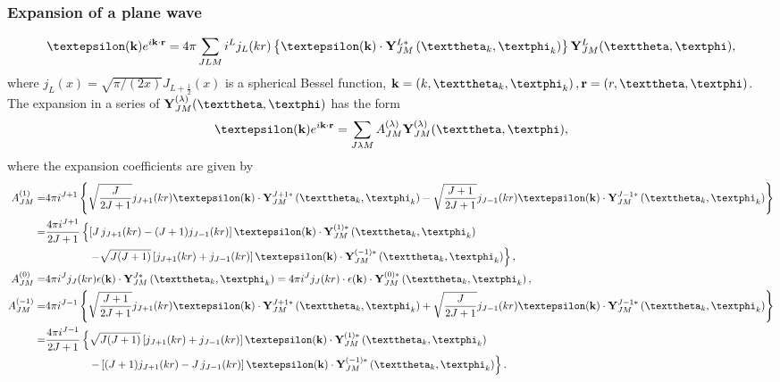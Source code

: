 \subsubsection{Expansion of a plane wave}
\begin{equation}
\boldsymbol{\varepsilon}(\vect{k}) e^{i \vect{k}\cdot\vect{r}}=4 \pi \sum_{J L M} i^{L} j_{L}(k r)\left\{\boldsymbol{\varepsilon}(\vect{k}) \cdot \vect{Y}_{J M}^{L *}\left(\vartheta_{k}, \varphi_{k}\right)\right\} \vect{Y}_{J M}^{L}(\vartheta, \varphi), \label{eq:7:3:131}
\end{equation}
where $j_{L}(x)=\sqrt{\pi /(2 x)} J_{L+\frac{1}{2}}(x)$ is a spherical Bessel function, $\vect{k}=\left(k, \vartheta_{k}, \varphi_{k}\right), \vect{r}=(r, \vartheta, \varphi)$. The expansion in a series of $\vect{Y}_{J M}^{(\lambda)}(\vartheta, \varphi)$ has the form
\begin{equation}
\boldsymbol{\varepsilon}(\vect{k}) e^{i \vect{k}\cdot\vect{r}}=\sum_{J \lambda M} A_{J M}^{(\lambda)} \vect{Y}_{J M}^{(\lambda)}(\vartheta, \varphi), \label{eq:7:3:132}
\end{equation}
where the expansion coefficients are given by
\begin{align}
A_{J M}^{(1)}=&4 \pi i^{J+1}  \left\{\sqrt{\frac{J}{2 J+1}} j_{J+1}(k r) \boldsymbol{\varepsilon}(\vect{k}) \cdot \vect{Y}_{J M}^{J+1 *}\left(\vartheta_{k}, \varphi_{k}\right)-\sqrt{\frac{J+1}{2 J+1}} j_{J-1}(k r) \boldsymbol{\varepsilon}(\vect{k}) \cdot \vect{Y}_{J M}^{J-1 *}\left(\vartheta_{k}, \varphi_{k}\right)\right\}  \notag\\
= & \frac{4 \pi i^{J+1}}{2 J+1}\left\{\left[J  \, j_{J+1}(k r)-(J+1) j_{J-1}(k r)\right] \boldsymbol{\varepsilon}(\vect{k}) \cdot \vect{Y}_{J M}^{(1) *}\left(\vartheta_{k}, \varphi_{k}\right)\right. \notag\\
& \qquad\qquad \left.-\sqrt{J(J+1)}\left[j_{J+1}(k r)+j_{J-1}(k r)\right] \boldsymbol{\varepsilon}(\vect{k}) \cdot \vect{Y}_{J M}^{(-1) *}\left(\vartheta_{k}, \varphi_{k}\right)\right\}, \label{eq:7:3:133}\\
A_{J M}^{(0)}=&4 \pi i^{J} j_{J}(k r) \vect{\epsilon}(\vect{k}) \cdot \vect{Y}_{J M}^{J *}\left(\vartheta_{k}, \varphi_{k}\right)=4 \pi i^{J} j_{J}(k r) \cdot \vect{\epsilon}(\vect{k}) \cdot \vect{Y}_{J M}^{(0) *}\left(\vartheta_{k}, \varphi_{k}\right) , \label{eq:7:3:134}\\
A_{J M}^{(-1)}=&4 \pi i^{J-1}\left\{\sqrt{\frac{J+1}{2 J+1}} j_{J+1}(k r) \boldsymbol{\varepsilon}(\vect{k}) \cdot \vect{Y}_{J M}^{J+1 *}\left(\vartheta_{k}, \varphi_{k}\right)+\sqrt{\frac{J}{2 J+1}} j_{J-1}(k r) \boldsymbol{\varepsilon}(\vect{k}) \cdot \vect{Y}_{J M}^{J-1 *}\left(\vartheta_{k}, \varphi_{k}\right)\right\}  \notag\\
=&\frac{4 \pi i^{J-1}}{2 J+1}\left\{\sqrt{J(J+1)}\left[j_{J+1}(k r)+j_{J-1}(k r)\right] \boldsymbol{\varepsilon}(\vect{k}) \cdot \vect{Y}_{J M}^{(1) *}\left(\vartheta_{k}, \varphi_{k}\right)\right. \notag\\
&\qquad\qquad \left.-\left[(J+1) j_{J+1}(k r)-J  \, j_{J-1}(k r)\right] \boldsymbol{\varepsilon}(\vect{k}) \cdot \vect{Y}_{J M}^{(-1) *}\left(\vartheta_{k}, \varphi_{k}\right)\right\}. \label{eq:7:3:135}
\end{align}
